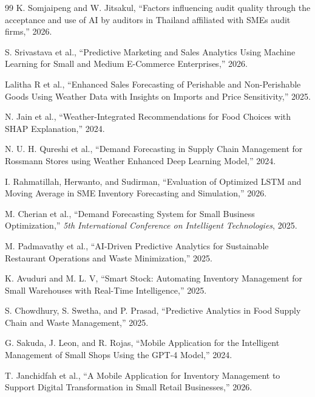 \documentclass[conference]{IEEEtran}
\begin{document}
\begin{thebibliography}{99}
K. Somjaipeng and W. Jitsakul, ``Factors influencing audit quality through the acceptance and use of AI by auditors in Thailand affiliated with SMEs audit firms,'' 2026.

S. Srivastava et al., ``Predictive Marketing and Sales Analytics Using Machine Learning for Small and Medium E-Commerce Enterprises,'' 2026.

Lalitha R et al., ``Enhanced Sales Forecasting of Perishable and Non-Perishable Goods Using Weather Data with Insights on Imports and Price Sensitivity,'' 2025.

N. Jain et al., ``Weather-Integrated Recommendations for Food Choices with SHAP Explanation,'' 2024.

N. U. H. Qureshi et al., ``Demand Forecasting in Supply Chain Management for Rossmann Stores using Weather Enhanced Deep Learning Model,'' 2024.

I. Rahmatillah, Herwanto, and Sudirman, ``Evaluation of Optimized LSTM and Moving Average in SME Inventory Forecasting and Simulation,'' 2026.

M. Cherian et al., ``Demand Forecasting System for Small Business Optimization,'' \emph{5th International Conference on Intelligent Technologies}, 2025.

M. Padmavathy et al., ``AI-Driven Predictive Analytics for Sustainable Restaurant Operations and Waste Minimization,'' 2025.

K. Avuduri and M. L. V, ``Smart Stock: Automating Inventory Management for Small Warehouses with Real-Time Intelligence,'' 2025.

S. Chowdhury, S. Swetha, and P. Prasad, ``Predictive Analytics in Food Supply Chain and Waste Management,'' 2025.

G. Sakuda, J. Leon, and R. Rojas, ``Mobile Application for the Intelligent Management of Small Shops Using the GPT-4 Model,'' 2024.

T. Janchidfah et al., ``A Mobile Application for Inventory Management to Support Digital Transformation in Small Retail Businesses,'' 2026.

\end{thebibliography}
\end{document}
